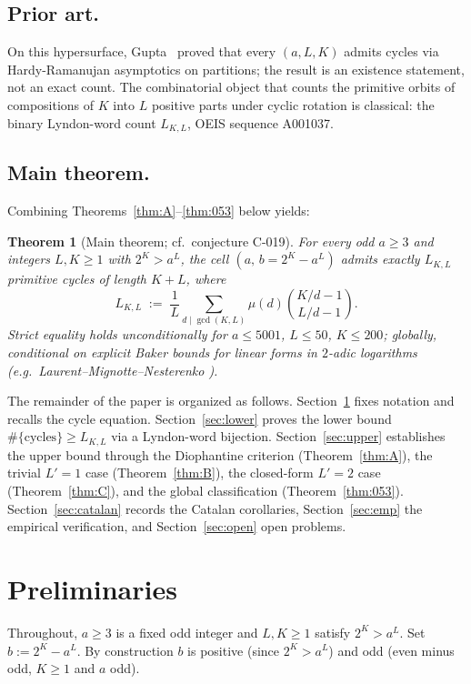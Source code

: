 \documentclass[11pt]{amsart}
\theoremstyle{plain}
\newtheorem{theorem}{Theorem}
\theoremstyle{definition}
\begin{document}
\subsection{Prior art.} On this hypersurface, Gupta~\cite{gupta} proved
that every $(a, L, K)$ admits cycles via Hardy-Ramanujan asymptotics on
partitions; the result is an existence statement, not an exact count.
The combinatorial object that counts the primitive orbits of
compositions of $K$ into $L$ positive parts under cyclic rotation is
classical: the binary Lyndon-word count $L_{K,L}$, OEIS sequence
A001037.

\subsection{Main theorem.} Combining
Theorems~\ref{thm:A}--\ref{thm:053} below yields:

\begin{theorem}[Main theorem; cf.~conjecture C-019] \label{thm:main}
For every odd $a \geq 3$ and integers $L, K \geq 1$ with $2^K > a^L$,
the cell $(a,\, b = 2^K - a^L)$ admits exactly $L_{K,L}$ primitive
cycles of length $K + L$, where
\[
L_{K,L} \;:=\; \frac{1}{L} \sum_{d \mid \gcd(K, L)}
\mu(d) \binom{K/d - 1}{L/d - 1}.
\]
Strict equality holds unconditionally for $a \leq 5001$, $L \leq 50$,
$K \leq 200$; globally, conditional on explicit Baker bounds for
linear forms in $2$-adic logarithms (e.g.~Laurent--Mignotte--Nesterenko
\cite{lmn}).
\end{theorem}

The remainder of the paper is organized as follows.
Section~\ref{sec:prelim} fixes notation and recalls the cycle
equation. Section~\ref{sec:lower} proves the lower bound
$\#\{\text{cycles}\} \geq L_{K,L}$ via a Lyndon-word bijection.
Section~\ref{sec:upper} establishes the upper bound through the
Diophantine criterion (Theorem~\ref{thm:A}), the trivial $L' = 1$
case (Theorem~\ref{thm:B}), the closed-form $L' = 2$ case
(Theorem~\ref{thm:C}), and the global classification
(Theorem~\ref{thm:053}). Section~\ref{sec:catalan} records the
Catalan corollaries, Section~\ref{sec:emp} the empirical
verification, and Section~\ref{sec:open} open problems.

\section{Preliminaries} \label{sec:prelim}

Throughout, $a \geq 3$ is a fixed odd integer and $L, K \geq 1$
satisfy $2^K > a^L$. Set $b := 2^K - a^L$. By construction $b$ is
positive (since $2^K > a^L$) and odd (even minus odd, $K \geq 1$ and
$a$ odd).
\end{document}
